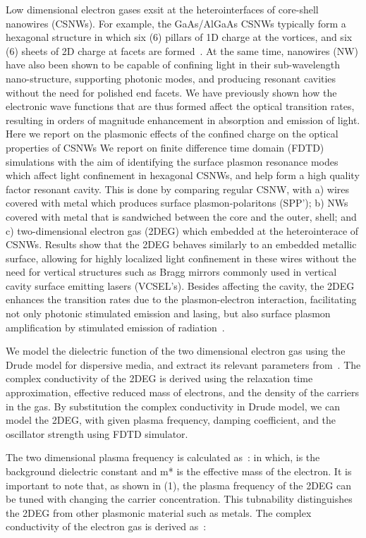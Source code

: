 Low dimensional electron gases exsit at the heterointerfaces of core-shell
nanowires (CSNWs). For example, the GaAs/AlGaAs CSNWs typically form a
hexagonal structure in which six (6) pillars of 1D charge at the vortices, and
six (6) sheets of 2D charge at facets  are formed~\cite{Wang:2015hz}. At the same time,
nanowires (NW) have also been shown to be capable of confining light in their
sub-wavelength nano-structure, supporting photonic modes, and producing
resonant cavities without the need for polished end facets. We have previously
shown how the electronic wave functions that are thus formed affect the optical
transition rates, resulting in orders of magnitude  enhancement in absorption
and emission of light. Here we report on the plasmonic effects of the
confined charge on the optical properties of CSNWs We report on finite
difference time domain (FDTD) simulations with the aim of identifying the
surface plasmon resonance modes which affect light confinement in hexagonal
CSNWs, and help form a  high quality factor resonant cavity. This is done by
comparing regular CSNW, with a) wires covered with metal which produces surface
plasmon-polaritons (SPP’); b) NWs covered with metal that is sandwiched between
the core and the outer, shell; and c) two-dimensional electron gas (2DEG)
which  embedded at the heterointerace of CSNWs. Results show that the 2DEG
behaves similarly to an embedded metallic surface, allowing for highly
localized light confinement in these wires without the need for vertical
structures such as Bragg mirrors commonly used in vertical cavity surface
emitting lasers (VCSEL’s). Besides affecting the cavity, the 2DEG enhances  the
transition rates due to the plasmon-electron interaction, facilitating not only
photonic stimulated emission and lasing, but also  surface plasmon
amplification by stimulated emission of radiation~\cite{Bergman:2003vo}.

We model the dielectric function of the two dimensional electron gas using the
Drude model for dispersive media, and extract its relevant parameters from~\cite{Bergman:2003vo}.
The complex conductivity of the 2DEG is derived using the relaxation time
approximation, effective reduced mass of electrons, and the density of the
carriers in the gas. By substitution the complex conductivity in Drude model,
we can model the 2DEG, with given plasma frequency, damping coefficient, and
the oscillator strength using FDTD simulator.

The two dimensional plasma frequency is calculated as~\cite{Bergman:2003vo}: in which,  is the
background dielectric constant and m* is the effective mass of the electron. It
is important to note that, as shown in (1), the plasma frequency of the 2DEG
can be tuned with changing the carrier concentration. This tubnability
distinguishes the 2DEG from other plasmonic material such as metals. The
complex conductivity of the electron gas is derived as~\cite{Bergman:2003vo}:

